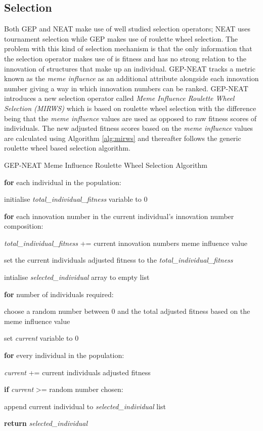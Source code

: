 \subsection{Selection}
Both GEP and NEAT make use of well studied selection operators; NEAT uses tournament selection while GEP makes use of roulette wheel selection. The problem with this kind of selection mechanism is that the only information that the selection operator makes use of is fitness and has no strong relation to the innovation of structures that make up an individual. GEP-NEAT tracks a metric known as the \textit{meme influence} as an additional attribute alongside each innovation number giving a way in which innovation numbers can be ranked. GEP-NEAT introduces a new selection operator called \textit{Meme Influence Roulette Wheel Selection (MIRWS)} which is based on roulette wheel selection with the difference being that the \textit{meme influence} values are used as opposed to raw fitness scores of individuals. The new adjusted fitness scores based on the \textit{meme influence} values are calculated using Algorithm \ref{alg:mirws} and thereafter follows the generic roulette wheel based selection algorithm.

\begin{algorithm}
	\caption{GEP-NEAT Meme Influence Roulette Wheel Selection Algorithm}\label{alg:mirws}
	\begin{algorithmic}[1]
	\item \textbf{for} each individual in the population:
	\item \quad initialise \textit{total\_individual\_fitness} variable to 0
	\item \quad \textbf{for} each innovation number in the current individual's innovation number composition:
	\item \quad \quad \textit{total\_individual\_fitness} += current innovation numbers meme influence value
	\item \quad set the current individuals adjusted fitness to the \textit{total\_individual\_fitness}
	\item
	\item intialise \textit{selected\_individual} array to empty list
	\item \textbf{for} number of individuals required:
	\item \quad choose a random number between 0 and the total adjusted fitness based on the meme influence value
	\item \quad set \textit{current} variable to 0
	\item \quad \textbf{for} every individual in the population:
	\item \quad \quad \textit{current} += current individuals adjusted fitness
	\item \quad \quad \textbf{if} \textit{current} >= random number chosen:
	\item \quad \quad \quad append current individual to \textit{selected\_individual} list
	\item \textbf{return} \textit{selected\_individual}
\end{algorithmic}
\end{algorithm}

